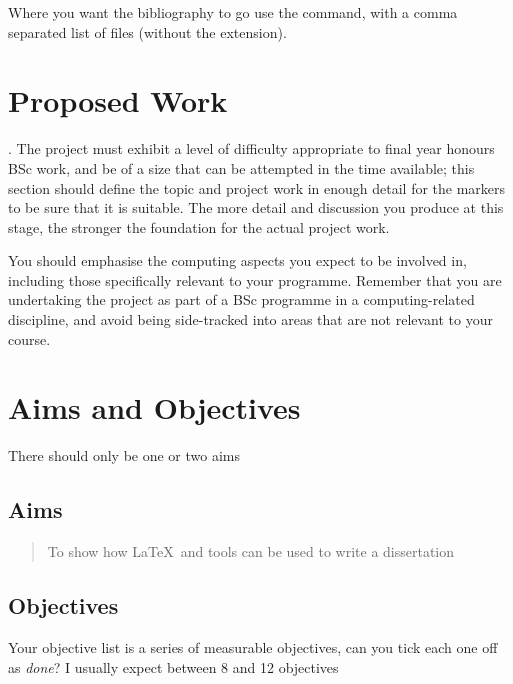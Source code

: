 Where you want the bibliography to go use the \texttt{} command, with a comma separated list of  files (without the extension).

\section{Proposed Work}
\label{proposed}
.  The project must exhibit a level of difficulty appropriate to final year honours BSc work, and be of a size that can be attempted in the time available; this section should define the topic and project work in enough detail for the markers to be sure that it is suitable. The more detail and discussion you produce at this stage, the stronger the foundation for the actual project work.

You should emphasise the computing aspects you expect to be involved in, including those specifically relevant to your programme.  Remember that you are undertaking the project as part of a BSc programme in a computing-related discipline, and avoid being side-tracked into areas that are not relevant to your course.

\section{Aims and Objectives}
There should only be one or two aims
\subsection{Aims}
\begin{quote}
	To show how \LaTeX\ and tools can be used to write a dissertation
\end{quote}

\subsection{Objectives}
Your objective list is a series of measurable objectives, can you tick each one off as \emph{done}?  I usually expect between 8 and 12 objectives

